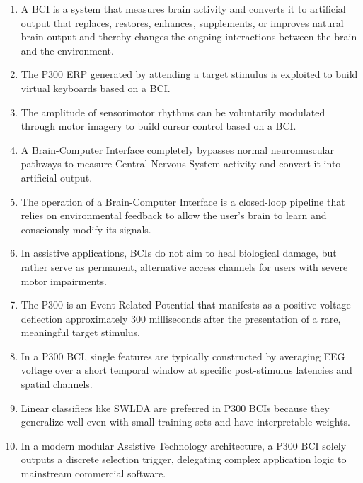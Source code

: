 \begin{enumerate}[label=\arabic*.]
    \item A BCI is a system that measures brain activity and converts it to artificial output that replaces, restores, enhances, supplements, or improves natural brain output and thereby changes the ongoing interactions between the brain and the environment.
    
    \item The P300 ERP generated by attending a target stimulus is exploited to build virtual keyboards based on a BCI.
    
    \item The amplitude of sensorimotor rhythms can be voluntarily modulated through motor imagery to build cursor control based on a BCI.
    
    \item A Brain-Computer Interface completely bypasses normal neuromuscular pathways to measure Central Nervous System activity and convert it into artificial output.
    
    \item The operation of a Brain-Computer Interface is a closed-loop pipeline that relies on environmental feedback to allow the user's brain to learn and consciously modify its signals.
    
    \item In assistive applications, BCIs do not aim to heal biological damage, but rather serve as permanent, alternative access channels for users with severe motor impairments.
    
    \item The P300 is an Event-Related Potential that manifests as a positive voltage deflection approximately 300 milliseconds after the presentation of a rare, meaningful target stimulus.
    
    \item In a P300 BCI, single features are typically constructed by averaging EEG voltage over a short temporal window at specific post-stimulus latencies and spatial channels.
    
    \item Linear classifiers like SWLDA are preferred in P300 BCIs because they generalize well even with small training sets and have interpretable weights.
    
    \item In a modern modular Assistive Technology architecture, a P300 BCI solely outputs a discrete selection trigger, delegating complex application logic to mainstream commercial software.
    

\end{enumerate}
